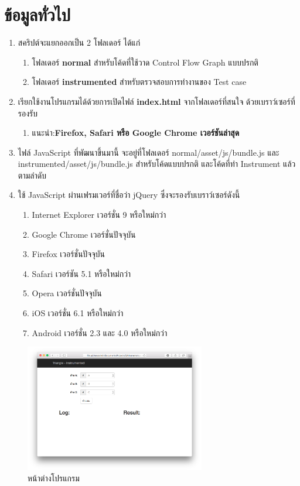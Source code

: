 \documentclass[12pt,a4paper]{article}
\begin{document}
    \section{ข้อมูลทั่วไป}
    \begin{enumerate}
        \item สคริปต์จะแยกออกเป็น 2 โฟลเดอร์ ได้แก่
            \begin{enumerate}
                \item โฟลเดอร์ {\bf normal} สำหรับโค้ดที่ใช้วาด Control Flow Graph แบบปรกติ
                \item โฟลเดอร์ {\bf instrumented} สำหรับตรวจสอบการทำงานของ Test case
            \end{enumerate}
        \item เรียกใช้งานโปรแกรมได้ด้วยการเปิดไฟล์ {\bf index.html} จากโฟลเดอร์ที่สนใจ ด้วยเบราว์เซอร์ที่รองรับ
            \begin{enumerate}
                \item แนะนำ:{\bf Firefox, Safari หรือ Google Chrome เวอร์ชันล่าสุด}
            \end{enumerate}
        \item ไฟล์ JavaScript ที่พัฒนาขึ้นมานี้ จะอยู่ที่โฟลเดอร์ normal/asset/js/bundle.js และ instrumented/asset/js/bundle.js สำหรับโค้ดแบบปรกติ และโค้ดที่ทำ Instrument แล้ว ตามลำดับ
        \item ใช้ JavaScript ผ่านเฟรมเวอร์ที่ชื่อว่า jQuery ซึ่งจะรองรับเบราว์เซอร์ดังนี้
            \begin{enumerate}
                \item Internet Explorer เวอร์ชั่น 9 หรือใหม่กว่า
                \item Google Chrome เวอร์ชั่นปัจจุบัน
                \item Firefox เวอร์ชั่นปัจจุบัน
                \item Safari เวอร์ชัน 5.1 หรือใหม่กว่า 
                \item Opera เวอร์ชั่นปัจจุบัน 
                \item iOS เวอร์ชั่น 6.1 หรือใหม่กว่า
                \item Android เวอร์ชั่น 2.3 และ 4.0 หรือใหม่กว่า
            \end{enumerate}
    \end{enumerate}

    \begin{figure}[h!]
        \label{fig:application}
        \centering
        \includegraphics[width=0.7\textwidth]{img/application.png}
        \caption{หน้าต่างโปรแกรม}
    \end{figure}
\end{document}
